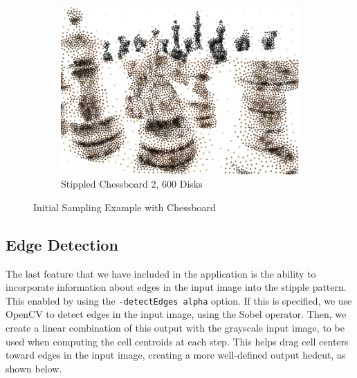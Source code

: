 \documentclass[11pt]{article}
\begin{document}
\begin{figure}[H]
\begin{subfigure}[b]{.48\linewidth}
		\includegraphics[width=\linewidth]{Chessboard-6000-2}
		\caption{Stippled Chessboard 2, 600 Disks}
		\label{fig:rfffd3}
	\end{subfigure}
	\caption{Initial Sampling Example with Chessboard}
	\label{fig:rfff4}
\end{figure}

\subsection{Edge Detection}

The last feature that we have included in the application is the ability to incorporate information about edges in the input image into the stipple pattern. This enabled by using the \verb|-detectEdges alpha| option. If this is specified, we use OpenCV to detect edges in the input image, using the Sobel operator. Then, we create a linear combination of this output with the grayscale input image, to be used when computing the cell centroids at each step. This helps drag cell centers toward edges in the input image, creating a more well-defined output hedcut, as shown below.
\end{document}
